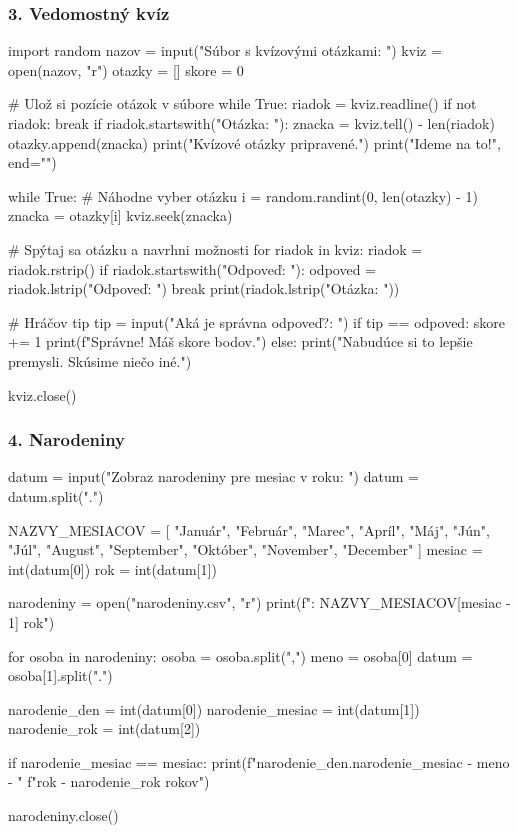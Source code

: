 \subsubsection*{3. Vedomostný kvíz}
\begin{solution}
import random
nazov = input("Súbor s kvízovými otázkami: ")
kviz = open(nazov, "r")
otazky = []
skore = 0

# Ulož si pozície otázok v súbore
while True:
    riadok = kviz.readline()
    if not riadok:
        break
    if riadok.startswith("Otázka: "):
        znacka = kviz.tell() - len(riadok)
        otazky.append(znacka)
print("Kvízové otázky pripravené.")
print("Ideme na to!", end="\n\n")

while True:
    # Náhodne vyber otázku
    i = random.randint(0, len(otazky) - 1)
    znacka = otazky[i]
    kviz.seek(znacka)

    # Spýtaj sa otázku a navrhni možnosti
    for riadok in kviz:
        riadok = riadok.rstrip()
        if riadok.startswith("Odpoveď: "):
            odpoved = riadok.lstrip("Odpoveď: ")
            break
        print(riadok.lstrip("Otázka: "))

    # Hráčov tip
    tip = input("Aká je správna odpoveď?: ")
    if tip == odpoved:
        skore += 1
        print(f"Správne! Máš {skore} bodov.\n")
    else:
        print("Nabudúce si to lepšie premysli. Skúsime niečo iné.\n")

kviz.close()
\end{solution}


\subsubsection*{4. Narodeniny}
\begin{solution}
datum = input("Zobraz narodeniny pre mesiac v roku: ")
datum = datum.split(".")

NAZVY_MESIACOV = [
	"Január", "Február", "Marec", "Apríl", "Máj", "Jún", "Júl",
	"August", "September", "Október", "November", "December"
]
mesiac = int(datum[0])
rok = int(datum[1])

narodeniny = open("narodeniny.csv", "r")
print(f"\nNarodeniny: {NAZVY_MESIACOV[mesiac - 1]} {rok}")

for osoba in narodeniny:
    osoba = osoba.split(",")
    meno = osoba[0]
    datum = osoba[1].split(".")

    narodenie_den = int(datum[0])
    narodenie_mesiac = int(datum[1])
    narodenie_rok = int(datum[2])

    if narodenie_mesiac == mesiac:
        print(f"{narodenie_den}.{narodenie_mesiac} - {meno} - "
              f"{rok - narodenie_rok} rokov")

narodeniny.close()
\end{solution}

